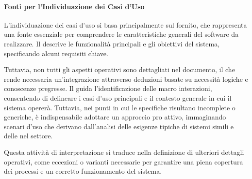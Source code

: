 \paragraph{Fonti per l'Individuazione dei Casi d'Uso}
L'individuazione dei casi d'uso si basa principalmente sul  fornito, che rappresenta una fonte essenziale per comprendere le caratteristiche generali del software da realizzare. 
Il  descrive le funzionalità principali e gli obiettivi del sistema, specificando alcuni requisiti chiave. 

Tuttavia, non tutti gli aspetti operativi sono dettagliati nel documento, il che rende necessaria un'integrazione attraverso deduzioni basate su necessità logiche e conoscenze pregresse. 
Il  guida l'identificazione delle macro interazioni, consentendo di delineare i casi d'uso principali e il contesto generale in cui il sistema opererà. 
Tuttavia, nei punti in cui le specifiche risultano incomplete o generiche, è indispensabile adottare un approccio pro attivo, immaginando scenari d'uso che derivano dall'analisi delle esigenze tipiche di sistemi simili e delle  nel settore.

Questa attività di interpretazione si traduce nella definizione di ulteriori dettagli operativi, come eccezioni o varianti necessarie per garantire una piena copertura dei processi e un corretto funzionamento del sistema.

